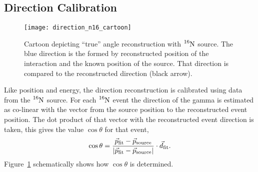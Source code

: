 \subsection{Direction Calibration}
\label{sec:direction_calibration}
\begin{figure}[htbp]
    \centering
    \texttt{[image: direction\_n16\_cartoon]}
    \caption[Cartoon of Direction Reconstruction With $\ce{^{16}N}$]{
        Cartoon depicting ``true'' angle reconstruction with $\ce{^{16}N}$
    source. The blue direction is the formed by reconstructed position
of the interaction and the known position of the source. That direction
    is compared to the reconstructed direction (black arrow).}
    \label{fig:n16_direction_cartoon}
\end{figure}
Like position and energy, the direction reconstruction is calibrated using data
from the $\ce{^{16}N}$ source. For each $\ce{^{16}N}$ event the direction
of the gamma is estimated as co-linear with the vector from the source
position to the reconstructed event position. The dot product of that vector
with the reconstructed event direction is taken, this gives the value $\cos\theta$
for that event,
\begin{equation}
    \cos\theta = \frac{\vec{p}_{\mathrm{fit}} - \vec{p}_{\mathrm{source}}}
                {\abs{\vec{p}_{\mathrm{fit}} - \vec{p}_{\mathrm{source}}}} \cdot \vec{d}_{\mathrm{fit}}\text{.}
\end{equation}
Figure~\ref{fig:n16_direction_cartoon} schematically shows how $\cos\theta$ is
determined.

